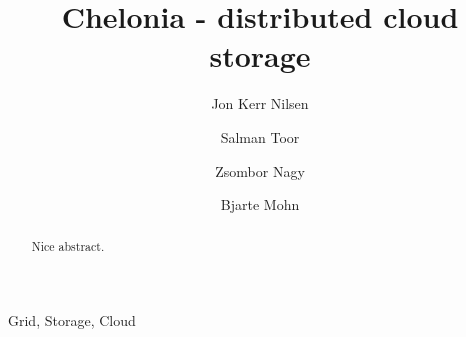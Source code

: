 \documentclass[preprint,12pt]{elsarticle}
\begin{document}
\begin{frontmatter}



\title{Chelonia - distributed cloud storage}


\author[UiO1,UiO2]{Jon Kerr Nilsen}

\author[UU1]{Salman Toor}

\author[NIIF]{Zsombor Nagy}

\author[UU2]{Bjarte Mohn}

\address[UiO1]{University of Oslo, Dept. of Physics,  P. O. Box 1048, Blindern, N-0316 Oslo, Norway}
\address[UiO2]{University of Oslo, Center for Information Technology, P. O. Box 1059, Blindern, N-0316 Oslo, Norway}
\address[UU1]{Dept. Information Technology, Div. of Scientific Computing Uppsala University, Box 256, SE-751 05 Uppsala, Sweden}
\address[NIIF]{Institute of National Information and Infrastructure Development NIIF/HUNGARNET, Victor Hugo 18-22, H-1132 Budapest, Hungary}
\address[UU2]{Dept. of Physics and Astronomy, Div. of Nuclear and Particle Physics, Uppsala University, Box 535, SE-75121 Uppsala, Sweden}


\begin{abstract}
Nice abstract. 
\end{abstract}

\begin{keyword}
Grid, Storage, Cloud


\end{keyword}

\end{frontmatter}
\end{document}

